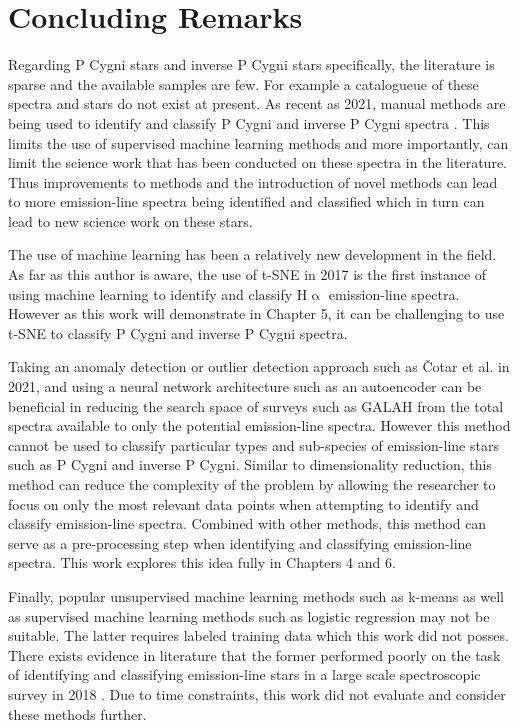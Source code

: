 \section{Concluding Remarks}

Regarding P Cygni stars and inverse P Cygni stars specifically, the literature is sparse and the available samples are few. For example a catalogueue of these spectra and stars do not exist at present. As recent as 2021, manual methods are being used to identify and classify P Cygni and inverse P Cygni spectra \cite{zhao2012lamost}. This limits the use of supervised machine learning methods and more importantly, can limit the science work that has been conducted on these spectra in the literature. Thus improvements to methods and the introduction of novel methods can lead to more emission-line spectra being identified and classified which in turn can lead to new science work on these stars. 

The use of machine learning has been a relatively new development in the field. As far as this author is aware, the use of t-SNE in 2017 is the first instance of using machine learning to identify and classify H$\upalpha$ emission-line spectra. However as this work will demonstrate in Chapter 5, it can be challenging to use t-SNE to classify P Cygni and inverse P Cygni spectra. 

Taking an anomaly detection or outlier detection approach such as Čotar et al. in 2021, and using a neural network architecture such as an autoencoder can be beneficial in reducing the search space of surveys such as GALAH from the total spectra available to only the potential emission-line spectra. However this method cannot be used to classify particular types and sub-species of emission-line stars such as P Cygni and inverse P Cygni. Similar to dimensionality reduction, this method can reduce the complexity of the problem by allowing the researcher to focus on only the most relevant data points when attempting to identify and classify emission-line spectra. Combined with other methods, this method can serve as a pre-processing step when identifying and classifying emission-line spectra. This work explores this idea fully in Chapters 4 and 6. 

Finally, popular unsupervised machine learning methods such as k-means as well as supervised machine learning methods such as logistic regression may not be suitable. The latter requires labeled training data \cite{zhang2021catalog} which this work did not posses. There exists evidence in literature that the former performed poorly on the task of identifying and classifying emission-line stars in a large scale spectroscopic survey in 2018 \cite{garcia2018machine}. Due to time constraints, this work did not evaluate and consider these methods further.

